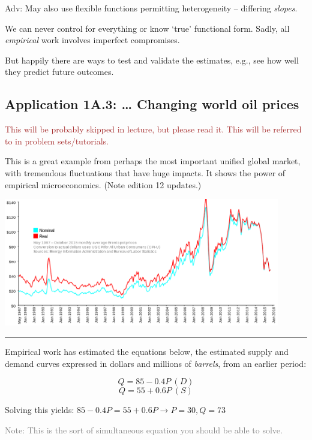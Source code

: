 \documentclass[]{article}
\begin{document}
\textcolor{RawSienna}{Adv: May also use flexible functions permitting heterogeneity -- differing \emph{slopes}.}

We can never control for everything or know `true' functional form. Sadly, all \emph{empirical} work involves imperfect compromises.

But happily there are ways to test and validate the estimates, e.g., see how well they predict future outcomes.

\hypertarget{application-1a.3-changing-world-oil-prices}{%
\subsection{Application 1A.3: \ldots{} Changing world oil prices}\label{application-1a.3-changing-world-oil-prices}}

\textcolor{brown}{This will be probably skipped in lecture, but please read it. This will be referred to in problem sets/tutorials.}

This is a great example from perhaps the most important unified global market, with tremendous fluctuations that have huge impacts.
It shows the power of empirical microeconomics. (Note edition 12 updates.)

\includegraphics[height=2.2in]{picsfigs/Brent_Spot_monthly.png}

\begin{center}\rule{0.5\linewidth}{\linethickness}\end{center}

Empirical work has estimated the equations below, the estimated supply and demand curves expressed in dollars and millions of \emph{barrels}, from an earlier period:

\[ Q = 85 - 0.4P \: (D) \]
\[ Q = 55 + 0.6P \: (S) \]

Solving this yields: \(85 - 0.4P=55+0.6P \rightarrow P = 30, Q = 73\)

\textcolor{gray}{Note: This is the sort of simultaneous equation you should be able to solve.}
\end{document}
